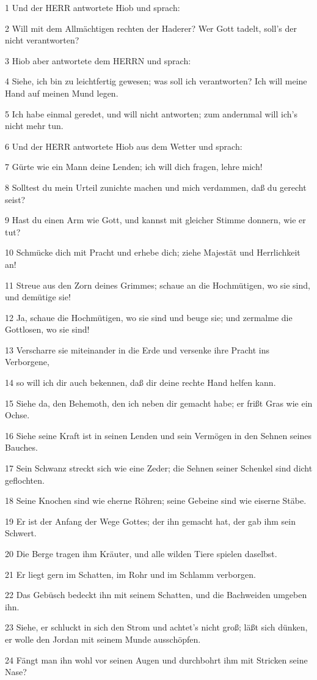 \par 1 Und der HERR antwortete Hiob und sprach:
\par 2 Will mit dem Allmächtigen rechten der Haderer? Wer Gott tadelt, soll's der nicht verantworten?
\par 3 Hiob aber antwortete dem HERRN und sprach:
\par 4 Siehe, ich bin zu leichtfertig gewesen; was soll ich verantworten? Ich will meine Hand auf meinen Mund legen.
\par 5 Ich habe einmal geredet, und will nicht antworten; zum andernmal will ich's nicht mehr tun.
\par 6 Und der HERR antwortete Hiob aus dem Wetter und sprach:
\par 7 Gürte wie ein Mann deine Lenden; ich will dich fragen, lehre mich!
\par 8 Solltest du mein Urteil zunichte machen und mich verdammen, daß du gerecht seist?
\par 9 Hast du einen Arm wie Gott, und kannst mit gleicher Stimme donnern, wie er tut?
\par 10 Schmücke dich mit Pracht und erhebe dich; ziehe Majestät und Herrlichkeit an!
\par 11 Streue aus den Zorn deines Grimmes; schaue an die Hochmütigen, wo sie sind, und demütige sie!
\par 12 Ja, schaue die Hochmütigen, wo sie sind und beuge sie; und zermalme die Gottlosen, wo sie sind!
\par 13 Verscharre sie miteinander in die Erde und versenke ihre Pracht ins Verborgene,
\par 14 so will ich dir auch bekennen, daß dir deine rechte Hand helfen kann.
\par 15 Siehe da, den Behemoth, den ich neben dir gemacht habe; er frißt Gras wie ein Ochse.
\par 16 Siehe seine Kraft ist in seinen Lenden und sein Vermögen in den Sehnen seines Bauches.
\par 17 Sein Schwanz streckt sich wie eine Zeder; die Sehnen seiner Schenkel sind dicht geflochten.
\par 18 Seine Knochen sind wie eherne Röhren; seine Gebeine sind wie eiserne Stäbe.
\par 19 Er ist der Anfang der Wege Gottes; der ihn gemacht hat, der gab ihm sein Schwert.
\par 20 Die Berge tragen ihm Kräuter, und alle wilden Tiere spielen daselbst.
\par 21 Er liegt gern im Schatten, im Rohr und im Schlamm verborgen.
\par 22 Das Gebüsch bedeckt ihn mit seinem Schatten, und die Bachweiden umgeben ihn.
\par 23 Siehe, er schluckt in sich den Strom und achtet's nicht groß; läßt sich dünken, er wolle den Jordan mit seinem Munde ausschöpfen.
\par 24 Fängt man ihn wohl vor seinen Augen und durchbohrt ihm mit Stricken seine Nase?

